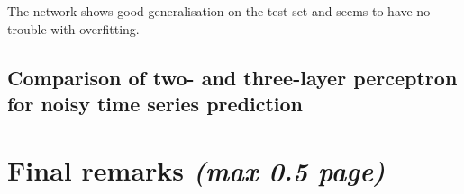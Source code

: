 \documentclass[a4paper]{article}
\begin{document}
The network shows good generalisation on the test set and seems to have no trouble with overfitting.



\subsection{Comparison of two- and three-layer perceptron for noisy time series prediction}

\section{Final remarks \normalsize{\textit{(max 0.5 page)}}}
\end{document}
